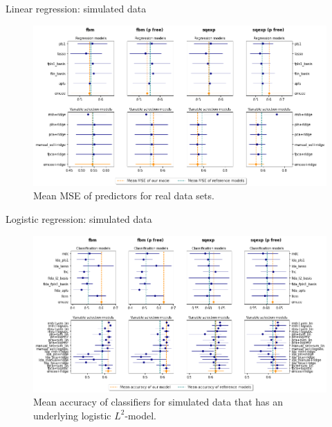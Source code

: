 \documentclass[10pt, english, professionalfonts]{beamer}
\begin{document}
\begin{frame}{Linear regression: simulated data}
    \vspace{1em}
  \begin{figure}
    \includegraphics[width=\textwidth]{img/reg_emcee_l2}
    \caption{Mean MSE of predictors for real data sets.}
  \end{figure}
\end{frame}

\begin{frame}{Logistic regression: simulated data}
    \vspace{1em}
  \begin{figure}
    \includegraphics[width=\textwidth]{img/clf_emcee_l2}
    \caption{Mean accuracy of classifiers for simulated data that has an underlying logistic \(L^2\)-model.}
  \end{figure}
\end{frame}
\end{document}
